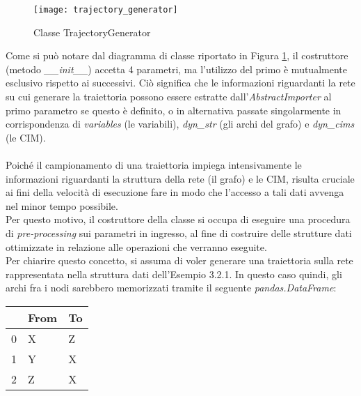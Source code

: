   \begin{figure}[H]
    \texttt{[image: trajectory\_generator]}
    \centering
    \caption{Classe TrajectoryGenerator}
    \label{fig:trajectory_generator}
  \end{figure}

  Come si può notare dal diagramma di classe riportato in Figura \ref{fig:trajectory_generator}, il costruttore (metodo \textit{\_\_init\_\_})
  accetta 4 parametri, ma l'utilizzo del primo è mutualmente esclusivo rispetto ai successivi. Ciò significa 
  che le informazioni riguardanti la rete su cui generare la traiettoria possono essere estratte dall'\textit{AbstractImporter}
  al primo parametro se questo è definito, o in alternativa passate singolarmente in corrispondenza di \textit{variables} (le variabili),
  \textit{dyn\_str} (gli archi del grafo) e \textit{dyn\_cims} (le CIM).
  
  \paragraph{}
  Poiché il campionamento di una traiettoria impiega intensivamente le informazioni riguardanti
  la struttura della rete (il grafo) e le CIM, risulta cruciale ai fini della velocità di esecuzione
  fare in modo che l'accesso a tali dati avvenga nel minor tempo possibile.\\
  Per questo motivo, il costruttore della classe si occupa di eseguire una procedura di \textit{pre-processing} 
  sui parametri in ingresso, al fine di costruire delle strutture dati ottimizzate in relazione alle operazioni che verranno eseguite.\\
  Per chiarire questo concetto, si assuma di voler generare una traiettoria sulla rete rappresentata
  nella struttura dati dell'Esempio 3.2.1. In questo caso quindi, gli archi fra i nodi
  sarebbero memorizzati tramite il seguente \textit{pandas.DataFrame}:
  
  \begin{center}
    \begin{tabular}{lll}
      \toprule
      {} & From & To \\   
      \midrule
      0 & X & Z \\  
      1 & Y & X \\  
      2 & Z & X \\    
      \bottomrule
    \end{tabular} 
  \end{center} 

